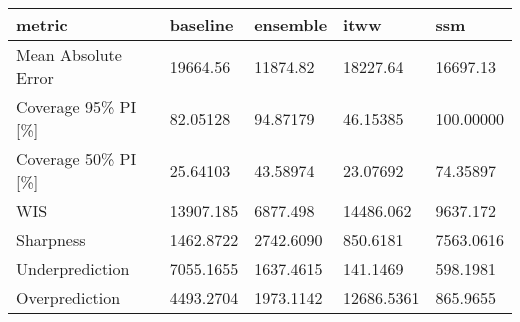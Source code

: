 
\begin{tabular}{lllll}
\toprule
metric & baseline & ensemble & itww & ssm\\
\midrule
Mean Absolute Error & 19664.56 & 11874.82 & 18227.64 & 16697.13\\
Coverage 95\% PI [\%] & 82.05128 & 94.87179 & 46.15385 & 100.00000\\
Coverage 50\% PI [\%] & 25.64103 & 43.58974 & 23.07692 & 74.35897\\
WIS & 13907.185 & 6877.498 & 14486.062 & 9637.172\\
Sharpness & 1462.8722 & 2742.6090 & 850.6181 & 7563.0616\\
\addlinespace
Underprediction & 7055.1655 & 1637.4615 & 141.1469 & 598.1981\\
Overprediction & 4493.2704 & 1973.1142 & 12686.5361 & 865.9655\\
\bottomrule
\end{tabular}